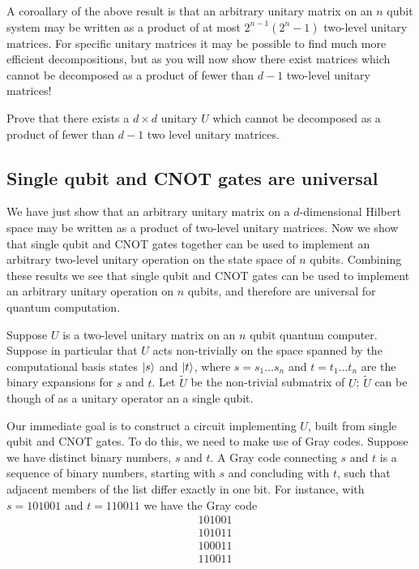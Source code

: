 A coroallary of the above result is that an arbitrary unitary matrix on an $n$ qubit system may be written as a product of at most $2^{n-1}(2^n-1)$ two-level unitary matrices. For specific unitary matrices it may be possible to find much more efficient decompositions, but as you will now show there exist matrices which cannot be decomposed as a product of fewer than $d-1$ two-level unitary matrices!
\begin{example}
    Prove that there exists a $d\times d$ unitary $U$ which cannot be decomposed as a product of fewer than $d-1$ two level unitary matrices.
\end{example}

\subsection{Single qubit and CNOT gates are universal}
We have just show that an arbitrary unitary matrix on a $d$-dimensional Hilbert space may be written as a product of two-level unitary matrices. Now we show that single qubit and CNOT gates together can be used to implement an arbitrary two-level unitary operation on the state space of $n$ qubits. Combining these results we see that single qubit and CNOT gates can be used to implement an arbitrary unitary operation on $n$ qubits, and therefore are universal for quantum computation.


Suppose $U$ is a two-level unitary matrix on an $n$ qubit quantum computer. Suppose in particular that $U$ acts non-trivially on the space spanned by the computational basis states $\ket{s}$ and $\ket{t}$, where $s=s_1\ldots s_n$ and $t=t_1\ldots t_n$ are the binary expansions for $s$ and $t$. Let $\tilde{U}$ be the non-trivial submatrix of $U$; $\tilde{U}$ can be though of as a unitary operator an a single qubit.

Our immediate goal is to construct a circuit implementing $U$, built from single qubit and CNOT gates. To do this, we need to make use of Gray codes. Suppose we have distinct binary numbers, $s$ and $t$. A Gray code connecting $s$ and $t$ is a sequence of binary numbers, starting with $s$ and concluding with $t$, such that adjacent members of the list differ exactly in one bit. For instance, with $s=101001$ and $t=110011$ we have the Gray code
\begin{align*}
&101001\\
&101011\\
&100011\\
&110011
\end{align*}


